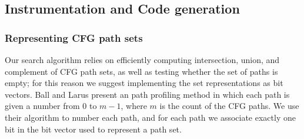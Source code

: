 \documentclass[12pt]{gatech-thesis}
\begin{document}

\subsection{Instrumentation and Code generation}

\subsubsection{Representing CFG path sets}

Our search algorithm relies on efficiently computing intersection, union, and complement of CFG path sets, as well as testing whether the set of paths is empty; for this reason we suggest implementing the set representations as bit vectors. 
Ball and Larus \cite{Ball1996} present an path profiling method in which each path is given a number from 0 to $m-1$, where $m$ is the count of the CFG paths. 
We use their algorithm to number each path, and for each path we associate exactly one bit in the bit vector used to represent a path set.
\end{document}
